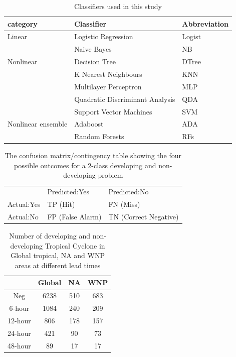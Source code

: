 \documentclass{article}
\begin{document}
\begin{table} [h]%
\centering
\caption{Classifiers used in this study}
\label{my-label}
\begin{tabular}{lll}
\hline
category                & Classifier                        & Abbreviation \\ \hline
{Linear}                & Logistic Regression               & Logist       \\
                        & Naive Bayes                       & NB           \\ \hline
{Nonlinear}             & Decision Tree                     & DTree        \\
                        & K  Nearest  Neighbours            & KNN          \\
                        & Multilayer Perceptron             & MLP          \\
                        & Quadratic Discriminant Analysis   & QDA          \\
                        & Support Vector Machines           & SVM          \\ \hline
{Nonlinear ensemble}    & Adaboost                          & ADA          \\
                        & Random Forests                    & RFs          \\
\hline
\end{tabular}
\end{table}

\begin{table}[h] %
 \caption{The confusion matrix/contingency table showing the four possible outcomes for a 2-class 
 developing and non-developing problem}
 \centering
 \begin{tabular}{l l l}
 \hline
               & Predicted:Yes    & Predicted:No   \\
   Actual:Yes  & TP (Hit)         & FN (Miss)   \\
   Actual:No   & FP (False Alarm) & TN (Correct Negative)  \\
\hline
\end{tabular}
\end{table}

\begin{table}[h]
\centering
\caption{Number of developing and non-developing Tropical Cyclone in Global tropical, NA and WNP 
areas at different lead times}
\begin{tabular}{cccc}
\hline
        & Global & NA  & WNP \\ \hline
Neg     & 6238   & 510 & 683 \\
6-hour  & 1084   & 240 & 209 \\
12-hour & 806    & 178 & 157 \\
24-hour & 421    & 90  & 73  \\
48-hour & 89     & 17  & 17  \\ \hline
\end{tabular}
\end{table}
\end{document}
